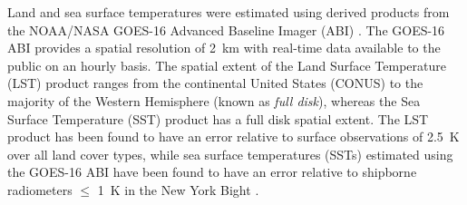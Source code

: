 \documentclass[11pt,a4paper]{article}
\begin{document}
Land and sea surface temperatures were estimated using derived products from the NOAA/NASA GOES-16 Advanced Baseline Imager (ABI) \citep{ignatov2010, yu2008}. The GOES-16 ABI provides a spatial resolution of \SI{2}{\kilo\meter} with real-time data available to the public on an hourly basis. The spatial extent of the Land Surface Temperature (LST) product ranges from the continental United States (CONUS) to the majority of the Western Hemisphere (known as \textit{full disk}), whereas the Sea Surface Temperature (SST) product has a full disk spatial extent. The LST product has been found to have an error relative to surface observations of \SI{2.5}{K} over all land cover types, while sea surface temperatures (SSTs) estimated using the GOES-16 ABI have been found to have an error relative to shipborne radiometers $\leq$ \SI{1}{\kelvin} in the New York Bight \citep{luo2021}.
\end{document}
